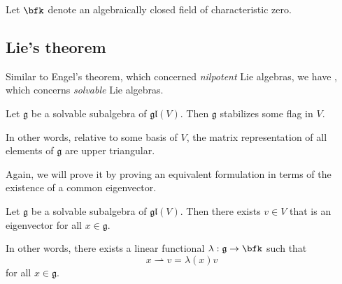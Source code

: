 \documentclass{article}
\newcommand*\frkg{{\ensuremath{\mathfrak{g}}}}
\newcommand*\glalg{\ensuremath{\mathfrak{gl}}}
\newcommand*\acts{\ensuremath{\rightharpoonup}}
\begin{document}
\begin{convention}
    Let $\bfk$ denote an algebraically closed field of characteristic zero.
\end{convention}

\subsection{Lie's theorem}

Similar to Engel's theorem, which concerned \textit{nilpotent} Lie algebras, we have , which concerns \textit{solvable} Lie algebras.

\begin{theorem}
    Let $\frkg$ be a solvable subalgebra of $\glalg(V)$.
    Then $\frkg$ stabilizes some flag in $V$.
\end{theorem}

In other words, relative to some basis of $V$, the matrix representation of all elements of $\frkg$ are upper triangular.

Again, we will prove it by proving an equivalent formulation in terms of the existence of a common eigenvector.

\begin{theorem}
    Let $\frkg$ be a solvable subalgebra of $\glalg(V)$.
    Then there exists $v \in V$ that is an eigenvector for all $x \in \frkg$.

    In other words, there exists a linear functional $\lambda: \frkg \to \bfk$ such that 
    \[
        x \acts v
        =
        \lambda(x)v
    \]
    for all $x \in \frkg$.
\end{theorem}
\end{document}

